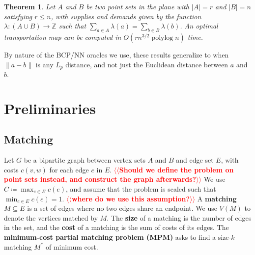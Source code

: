 \documentclass[11pt]{article}
\makeatletter
\def\polylog{\mathop{\mathrm{polylog}}}
\def\ints{\mathbb{Z}}
\def\tsupply{\lambda}
\theoremstyle{plain}
\newtheorem{theorem}[lemma]{Theorem}
\numberwithin{figure}{section}
\def\EMPH#1{\textbf{\boldmath #1}}
\def\n@te#1{\textsf{\boldmath \textbf{$\langle\!\langle$#1$\rangle\!\rangle$}}\leavevmode}
\def\note#1{\textcolor{red}{\n@te{#1}}}
\makeatother
\begin{document}
\begin{theorem}
\label{theorem:orlin}
Let $A$ and $B$ be two point sets in the plane with $|A| = r$ and $|B| = n$
satisfying $r \le n$, with supplies and demands given by the function
$\tsupply: (A \cup B) \to \ints$ such that
$\sum_{a \in A} \tsupply(a) = \sum_{b \in B} \tsupply(b)$.
An optimal transportation map can be computed in $O(rn^{3/2}\polylog n)$ time.
\end{theorem}



By nature of the BCP/NN oracles we use, these results generalize to when
$\|a - b\|$ is any $L_p$ distance, and not just the Euclidean distance between
$a$ and $b$.


\section{Preliminaries}
\label{section:prelim}

\subsection{Matching}

Let $G$ be a bipartite graph between vertex sets $A$ and $B$ and edge set $E$,
with costs $c(v, w)$ for each edge $e$ in $E$.
\note{Should we define the problem on point sets instead, and construct the graph afterwards?}
We use $C \coloneqq \max_{e \in E} c(e)$, and assume that the problem is scaled such
that $\min_{e \in E} c(e) = 1$. \note{where do we use this assumption?}
A \EMPH{matching} $M \subseteq E$ is a set of edges where no two edges share an
endpoint.
We use $V(M)$ to denote the vertices matched by $M$.
The \EMPH{size} of a matching is the number of edges in the set, and the
\EMPH{cost} of a matching is the sum of costs of its edges.
The \EMPH{minimum-cost partial matching problem (MPM)} asks to find a size-$k$
matching $M^*$ of minimum cost.
\end{document}
